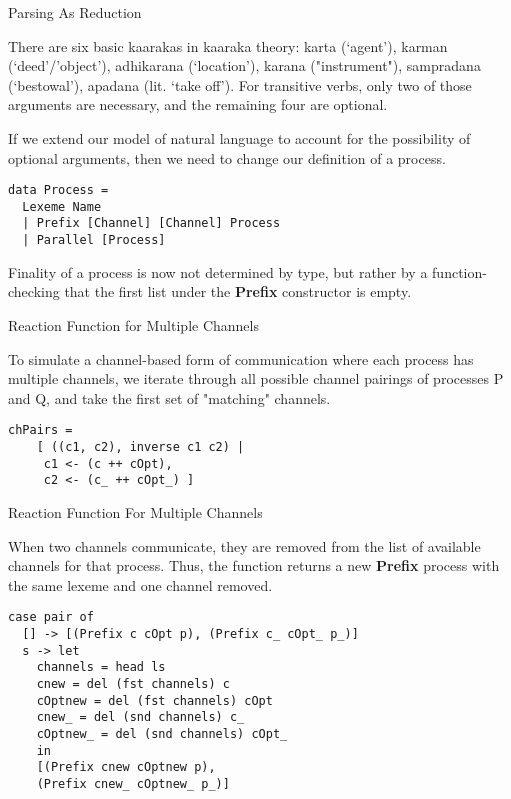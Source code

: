 \documentclass{beamer}
\begin{document}
\begin{frame}[fragile]{Parsing As Reduction}

There are six basic kaarakas in kaaraka theory: karta (‘agent’), karman (‘deed’/’object’), adhikarana (‘location’), karana ("instrument"), sampradana (‘bestowal’), apadana (lit. ‘take off’). For transitive verbs, only two of those arguments are necessary, and the remaining four are optional.

If we extend our model of natural language to account for the possibility of optional arguments, then we need to change our definition of a process.

\begin{lstlisting}
data Process =
  Lexeme Name
  | Prefix [Channel] [Channel] Process
  | Parallel [Process]
\end{lstlisting}

Finality of a process is now not determined by type, but rather by a function- checking that the first list under the \textbf{Prefix} constructor is empty.

\end{frame}

\begin{frame}[fragile]{Reaction Function for Multiple Channels}

To simulate a channel-based form of communication where each process has multiple channels, we iterate through all possible channel pairings of processes P and Q, and take the first set of "matching" channels.

\begin{lstlisting}
chPairs = 
    [ ((c1, c2), inverse c1 c2) | 
     c1 <- (c ++ cOpt), 
     c2 <- (c_ ++ cOpt_) ]
\end{lstlisting}

\end{frame}

\begin{frame}[fragile]{Reaction Function For Multiple Channels}

When two channels communicate, they are removed from the list of available channels for that process. Thus, the function returns a new \textbf{Prefix} process with the same lexeme and one channel removed.

\begin{lstlisting}
case pair of
  [] -> [(Prefix c cOpt p), (Prefix c_ cOpt_ p_)]
  s -> let
    channels = head ls
    cnew = del (fst channels) c
    cOptnew = del (fst channels) cOpt
    cnew_ = del (snd channels) c_
    cOptnew_ = del (snd channels) cOpt_
    in
    [(Prefix cnew cOptnew p), 
    (Prefix cnew_ cOptnew_ p_)]
\end{lstlisting}

\end{frame}
\end{document}

